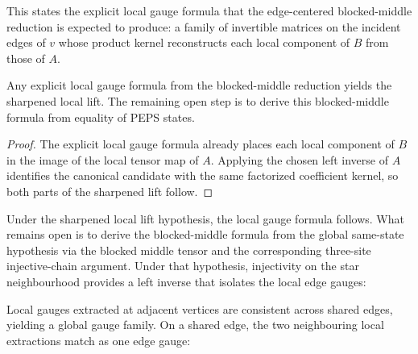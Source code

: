 \begin{definition}%
    \label{def:peps_blockedMiddleGaugeHyp}
    \leanok
    This states the explicit local gauge formula that the edge-centered
    blocked-middle reduction is expected to produce: a family of invertible
    matrices on the incident edges of $v$ whose product kernel reconstructs each
    local component of $B$ from those of $A$.
\end{definition}

\begin{theorem}%
    \label{thm:peps_hasLocalGaugeLift_of_blockedMiddleGaugeHyp}
    \leanok
    Any explicit local gauge formula from the blocked-middle reduction yields
    the sharpened local lift. The remaining open step is to derive this
    blocked-middle formula from equality of PEPS states.
\end{theorem}
\begin{proof}\leanok
    The explicit local gauge formula already places each local component of
    $B$ in the image of the local tensor map of $A$. Applying the chosen left
    inverse of $A$ identifies the canonical candidate with the same factorized
    coefficient kernel, so both parts of the sharpened lift follow.
\end{proof}

\begin{theorem}%
    \label{thm:localGauge_exists}
    \notready
    Under the sharpened local lift hypothesis, the local gauge formula follows.
    What remains open is to derive the blocked-middle formula from the global
    same-state hypothesis via the blocked middle tensor and the corresponding
    three-site injective-chain argument.
    Under that hypothesis, injectivity on the star neighbourhood provides a
    left inverse that isolates the local edge gauges:
    \begin{center}
        \TNPEPSLocalGaugeExtraction
    \end{center}
\end{theorem}

\begin{theorem}%
    \label{thm:gaugeConsistency}
    \notready
    Local gauges extracted at adjacent vertices are consistent across
    shared edges, yielding a global gauge family.
    On a shared edge, the two neighbouring local extractions match as one
    edge gauge:
    \begin{center}
        \TNPEPSGlobalConsistency
    \end{center}
\end{theorem}

